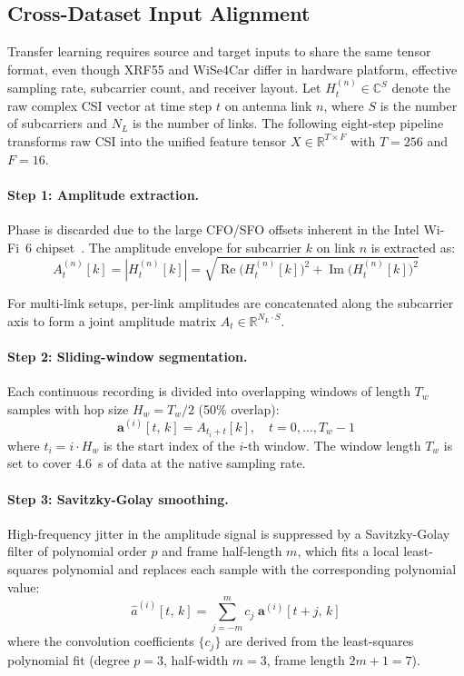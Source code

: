 \documentclass[english,bibtex]{kththesis}
\begin{document}
\subsection{Cross-Dataset Input Alignment}
\label{sec:preprocessing}

Transfer learning requires source and target inputs to share the same tensor format, even though XRF55 and WiSe4Car differ in hardware platform, effective sampling rate, subcarrier count, and receiver layout. Let $H^{(n)}_t \in \mathbb{C}^{S}$ denote the raw complex CSI vector at time step $t$ on antenna link $n$, where $S$ is the number of subcarriers and $N_L$ is the number of links. The following eight-step pipeline transforms raw CSI into the unified feature tensor $X \in \mathbb{R}^{T \times F}$ with $T = 256$ and $F = 16$.

\paragraph{Step 1: Amplitude extraction.}
Phase is discarded due to the large CFO/SFO offsets inherent in the Intel Wi-Fi~6 chipset~\cite{yousefi2017survey}. The amplitude envelope for subcarrier $k$ on link $n$ is extracted as:
\begin{equation}
  A^{(n)}_t[k] = \left|H^{(n)}_t[k]\right|
               = \sqrt{\operatorname{Re}\!\bigl(H^{(n)}_t[k]\bigr)^2
                      +\operatorname{Im}\!\bigl(H^{(n)}_t[k]\bigr)^2}
\end{equation}

For multi-link setups, per-link amplitudes are concatenated along the subcarrier axis to form a joint amplitude matrix $A_t \in \mathbb{R}^{N_L \cdot S}$.

\paragraph{Step 2: Sliding-window segmentation.}
Each continuous recording is divided into overlapping windows of length $T_w$ samples with hop size $H_w = T_w/2$ (50\% overlap):
\begin{equation}
  \mathbf{a}^{(i)}[t,\,k] = A_{t_i + t}[k],\quad t = 0,\ldots,T_w{-}1
\end{equation}
where $t_i = i\cdot H_w$ is the start index of the $i$-th window. The window length $T_w$ is set to cover 4.6~s of data at the native sampling rate.

\paragraph{Step 3: Savitzky-Golay smoothing.}
High-frequency jitter in the amplitude signal is suppressed by a Savitzky-Golay filter of polynomial order $p$ and frame half-length $m$, which fits a local least-squares polynomial and replaces each sample with the corresponding polynomial value:
\begin{equation}
  \hat{a}^{(i)}[t,\,k]
    = \sum_{j=-m}^{m} c_j\;\mathbf{a}^{(i)}[t{+}j,\,k]
\end{equation}
where the convolution coefficients $\{c_j\}$ are derived from the least-squares polynomial fit (degree $p = 3$, half-width $m = 3$, frame length $2m{+}1 = 7$).
\end{document}
